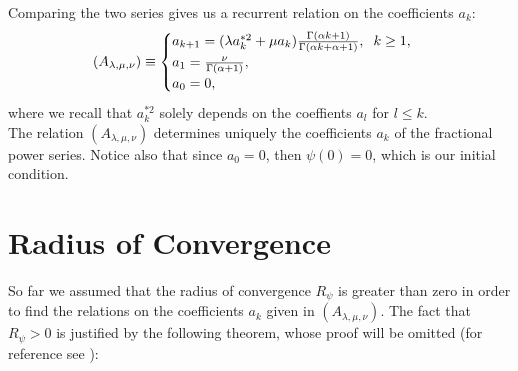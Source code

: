 \documentclass[a4paper,italian,11pt]{book}
\theoremstyle{plain}
\theoremstyle{remark}
\theoremstyle{plain}
\begin{document}
Comparing the two series gives us a recurrent relation on the coefficients $a_k$:
\begin{equation} 
    \label{eq: recurrent1}
    (A_{\lambda, \mu, \nu} ) \equiv
    \begin{cases}
    a_{k+1} = (\lambda a_k^{*2} + \mu a_k) \frac{\Gamma(\alpha k +1)}{\Gamma(\alpha k + \alpha  +1)}, \hspace{0.2cm} k\ge 1,
    \\
    a_1 = \frac{\nu}{\Gamma(\alpha+1)}, 
    \\
    a_0 = 0,
    \end{cases}
\end{equation}
where we recall that $a_k^{*2}$ solely depends on the coeffients $a_l$ for $l\le k$.
\\
The relation $(A_{\lambda, \mu, \nu} )$ determines uniquely the coefficients $a_k$ of the fractional power series. 
Notice also that since $a_0=0$, then $\psi(0)=0$, which is our initial condition.


\section{Radius of Convergence}

So far we assumed that the radius of convergence $R_\psi$ is greater than zero in order to find the relations on the coefficients $a_k$ given in $(A_{\lambda, \mu, \nu} )$. The fact that $R_\psi>0$ is justified by the following theorem, whose proof will be omitted (for reference see \cite{Main}):
\end{document}
